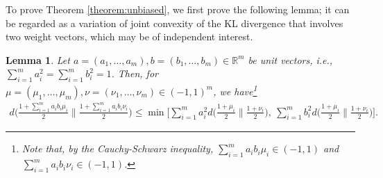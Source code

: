 \documentclass[journal,draftcls, onecolumn]{IEEEtran}
\newtheorem{lemma}{Lemma}
\begin{document}
To prove Theorem \ref{theorem:unbiased}, we first prove the following lemma; 
it can be regarded as a variation of joint convexity of the KL divergence 
that involves two weight vectors, which may be of independent interest. 
\begin{lemma} \label{lemma:inner-product-convexity}
Let $a = (a_1,\ldots,a_m), b= (b_1,\ldots,b_m) \in \mathbb{R}^m$ be unit vectors, i.e., $\sum_{i=1}^m a_i^2 =  \sum_{i=1}^m b_i^2  = 1$.
Then, for $\mu = (\mu_1,\ldots,\mu_m), \nu = (\nu_1,\ldots,\nu_m) \in (-1,1)^m$, we have\footnote{Note that, by the Cauchy-Schwarz inequality,
$\sum_{i=1}^m a_i b_i \mu_i \in (-1,1)$ and $\sum_{i=1}^m a_i b_i \nu_i \in (-1,1)$.}
\begin{align}
d\bigg( \frac{1 + \sum_{i=1}^m a_i b_i \mu_i}{2} \bigg\| \frac{1+ \sum_{i=1}^m a_i b_i \nu_i}{2} \bigg) 
\le \min\bigg[
\sum_{i=1}^m a_i^2 d\bigg( \frac{1+\mu_i}{2} \bigg\| \frac{1+\nu_i}{2} \bigg),~\sum_{i=1}^m b_i^2 d\bigg( \frac{1+\mu_i}{2} \bigg\| \frac{1+\nu_i}{2} \bigg)
\bigg].
\end{align}
\end{lemma}
\end{document}
